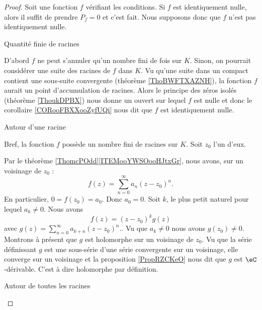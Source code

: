 \begin{proof}
    Soit une fonction $f$ vérifiant les conditions. Si \( f\) est identiquement nulle, alors il suffit de prendre \( P_f=0\) et c'est fait. Nous supposons donc que \( f\) n'est pas identiquement nulle.

    \begin{subproof}
    \item[Quantité finie de racines]

    D'abord \( f\) ne peut s'annuler qu'un nombre fini de fois sur \( K\). Sinon, on pourrait considérer une suite des racines de \( f\) dans \( K\). Vu qu'une suite dans un compact contient une sous-suite convergente (théorème \ref{ThoBWFTXAZNH}), la fonction \( f\) aurait un point d'accumulation de racines. Alors le principe des zéros isolés (théorème \ref{ThoukDPBX}) nous donne un ouvert sur lequel \( f\) est nulle et donc le corollaire \ref{CORooFBXXooZyfUQi} nous dit que \( f\) est identiquement nulle.

\item[Autour d'une racine]

    Bref, la fonction \( f\) possède un nombre fini de racines sur \( K\). Soit \( z_0\) l'un d'eux.

    Par le théorème \ref{ThomcPOdd}\ref{ITEMooYWSOooHJtxGr}, nous avons, sur un voisinage de \( z_0\) :
    \begin{equation}
        f(z)=\sum_{n=0}^{\infty}a_n(z-z_0)^n.
    \end{equation}
    En particulier, \( 0=f(z_0)=a_0\). Donc \( a_0=0\). Soit \( k\), le plus petit naturel pour lequel \( a_k\neq 0\). Nous avons
    \begin{equation}
        f(z)=(z-z_0)^kg(z)
    \end{equation}
    avec \( g(z)= \sum_{n=0}^{\infty}a_{k+n}(z-z_0)^n.\). Vu que \( a_{k}\neq 0\) nous avons \( g(z_0)\neq 0\). Montrons à présent que \( g\) est holomorphe sur un voisinage de \( z_0\). Vu que la série définissant \( g\) est une sous-série d'une série convergente sur un voisinage, elle converge sur un voisinage et la proposition \ref{PropRZCKeO} nous dit que \( g\) est \( \eC\)-dérivable. C'est à dire holomorphe par définition.

        \item[Autour de toutes les racines]


\end{subproof}
\end{proof}
